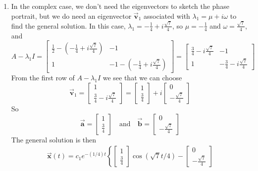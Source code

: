 \documentclass{book}
\newcommand{\BA}{\vec{\textbf{a}}}
\newcommand{\BB}{\vec{\textbf{b}}}
\newcommand{\BV}{\vec{\textbf{v}}}
\newcommand{\BX}{\vec{\textbf{x}}}
\begin{document}
\begin{enumerate}
\item In the complex case, we don't need the eigenvectors
to sketch the phase portrait, but we do need an eigenvector
$\BV_1$ associated with $\lambda_1 = \mu + i \omega$
to find the general solution.
In this case, $\lambda_1 = -\frac{1}{4}+i\frac{\sqrt{7}}{4}$,
so $\mu = -\frac{1}{4}$ and $\omega = \frac{\sqrt{7}}{4}$,
and
\begin{equation}
A-\lambda_1 I =
  \begin{bmatrix}
     \frac{1}{2} - \left( -\frac{1}{4}+i\frac{\sqrt{7}}{4} \right) & -1 \\
     1 & -1 -\left( -\frac{1}{4}+i\frac{\sqrt{7}}{4} \right)
  \end{bmatrix}
     = 
  \begin{bmatrix}
          \frac{3}{4}-i\frac{\sqrt{7}}{4} & -1 \\
	  1 & -\frac{3}{4}-i\frac{\sqrt{7}}{4}
  \end{bmatrix}
\end{equation}
From the first row of $A-\lambda_1 I$ we see that we can choose
\begin{equation}
  \BV_1 = \begin{bmatrix} 1 \\ \frac{3}{4}-i\frac{\sqrt{7}}{4} \end{bmatrix}
   = \begin{bmatrix} 1 \\ \frac{3}{4} \end{bmatrix}
      + i \begin{bmatrix} 0 \\ -\frac{\sqrt{7}}{4} \end{bmatrix}
\end{equation}
So
\begin{equation}
  \BA = \begin{bmatrix} 1 \\ \frac{3}{4} \end{bmatrix}
  \quad \textrm{and} \quad
  \BB = \begin{bmatrix} 0 \\ -\frac{\sqrt{7}}{4} \end{bmatrix}
\end{equation}
The general solution is then
\begin{multline}
  \BX(t) = c_1 e^{-(1/4)t}
      \left\{\begin{bmatrix} 1 \\ \frac{3}{4} \end{bmatrix} \cos\left( \sqrt{7}t/4\right)
      - \begin{bmatrix} 0 \\ -\frac{\sqrt{7}}{4} \end{bmatrix}

\end{multline}
\end{enumerate}
\end{document}
